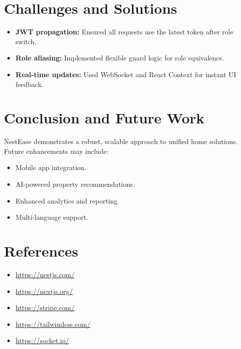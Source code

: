 \documentclass[12pt]{article}
\begin{document}
\section{Challenges and Solutions}
\begin{itemize}
    \item \textbf{JWT propagation:} Ensured all requests use the latest token after role switch.
    \item \textbf{Role aliasing:} Implemented flexible guard logic for role equivalence.
    \item \textbf{Real-time updates:} Used WebSocket and React Context for instant UI feedback.
\end{itemize}

\section{Conclusion and Future Work}
NestEase demonstrates a robust, scalable approach to unified home solutions. Future enhancements may include:
\begin{itemize}
    \item Mobile app integration.
    \item AI-powered property recommendations.
    \item Enhanced analytics and reporting.
    \item Multi-language support.
\end{itemize}

\section*{References}
\begin{itemize}
    \item \url{https://nestjs.com/}
    \item \url{https://nextjs.org/}
    \item \url{https://stripe.com/}
    \item \url{https://tailwindcss.com/}
    \item \url{https://socket.io/}
\end{itemize}
\end{document}
